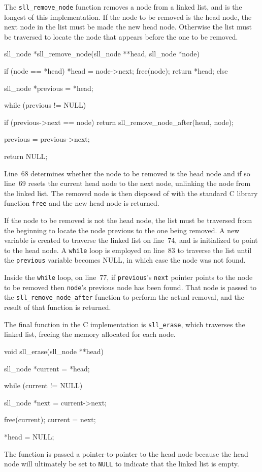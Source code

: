 \documentclass{article}
\begin{document}
  The \verb|sll_remove_node| function removes a node from a linked list, and is the longest of this implementation. If the node to be removed is the head node, the next node in the list must be made the new head node. Otherwise the list must be traversed to locate the node that appears before the one to be removed.
  \begin{lstc}
sll_node *sll_remove_node(sll_node **head, sll_node *node) {
  if (node == *head) {
    *head = node->next;
    free(node);
    return *head;
  }
  else {
    sll_node *previous = *head;

    while (previous != NULL) {
      if (previous->next == node)
        return sll_remove_node_after(head, node);

      previous = previous->next;
    }
  }

  return NULL;
}\end{lstc}
  Line~68 determines whether the node to be removed is the head node and if so line~69 resets the current head node to the next node, unlinking the node from the linked list. The removed node is then disposed of with the standard C library function \verb|free| and the new head node is returned.

  If the node to be removed is not the head node, the list must be traversed from the beginning to locate the node previous to the one being removed. A new variable is created to traverse the linked list on line~74, and is initialized to point to the head node. A \verb|while| loop is employed on line~83 to traverse the list until the \verb|previous| variable becomes NULL, in which case the node was not found.

  Inside the \verb|while| loop, on line~77, if \verb|previous|'s \verb|next| pointer points to the node to be removed then \verb|node|'s previous node has been found. That node is passed to the \verb|sll_remove_node_after| function to perform the actual removal, and the result of that function is returned.

  The final function in the C implementation is \verb|sll_erase|, which traverses the linked list, freeing the memory allocated for each node.
  \begin{lstc}
void sll_erase(sll_node **head) {
  sll_node *current = *head;

  while (current != NULL) {
    sll_node *next = current->next;

    free(current);
    current = next;
  }

  *head = NULL;
}\end{lstc}
  The function is passed a pointer-to-pointer to the head node because the head node will ultimately be set to \verb|NULL| to indicate that the linked list is empty.
\end{document}
